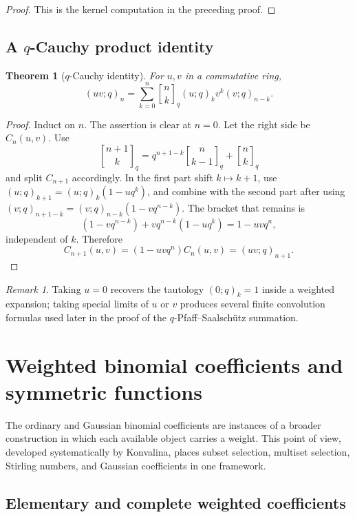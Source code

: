 \documentclass[11pt,oneside,openany]{book}
\newtheorem{theorem}{Theorem}[chapter]
\theoremstyle{definition}
\theoremstyle{remark}
\newtheorem{remark}[remark]{Remark}
\newcommand{\qbinom}[2]{\genfrac{[}{]}{0pt}{}{#1}{#2}_{q}}
\begin{document}
\begin{proof}
This is the kernel computation in the preceding proof.
\end{proof}

\section{A \texorpdfstring{$q$}{q}-Cauchy product identity}

\begin{theorem}[$q$-Cauchy identity]\label{thm:q-cauchy}
For $u,v$ in a commutative ring,
\[
 (uv;q)_n
 =\sum_{k=0}^{n}\qbinom nk (u;q)_k v^k(v;q)_{n-k}.
\]
\end{theorem}

\begin{proof}
Induct on $n$.  The assertion is clear at $n=0$.  Let the right side be $C_n(u,v)$.  Use
\[
 \qbinom{n+1}{k}=q^{n+1-k}\qbinom n{k-1}+\qbinom nk
\]
and split $C_{n+1}$ accordingly.  In the first part shift $k\mapsto k+1$, use
\((u;q)_{k+1}=(u;q)_k(1-uq^k)\), and combine with the second part after using
\((v;q)_{n+1-k}=(v;q)_{n-k}(1-vq^{n-k})\).
The bracket that remains is
\[
 (1-vq^{n-k})+vq^{n-k}(1-uq^k)=1-uvq^n,
\]
independent of $k$.  Therefore
\[
 C_{n+1}(u,v)=(1-uvq^n)C_n(u,v)=(uv;q)_{n+1}.
\]
\end{proof}

\begin{remark}
Taking $u=0$ recovers the tautology $(0;q)_k=1$ inside a weighted expansion; taking special limits of $u$ or $v$ produces several finite convolution formulas used later in the proof of the $q$-Pfaff--Saalsch\"utz summation.
\end{remark}


\chapter{Weighted binomial coefficients and symmetric functions}\label{chap:weighted}

The ordinary and Gaussian binomial coefficients are instances of a broader construction in which each available object carries a weight.  This point of view, developed systematically by Konvalina, places subset selection, multiset selection, Stirling numbers, and Gaussian coefficients in one framework.

\section{Elementary and complete weighted coefficients}
\end{document}
